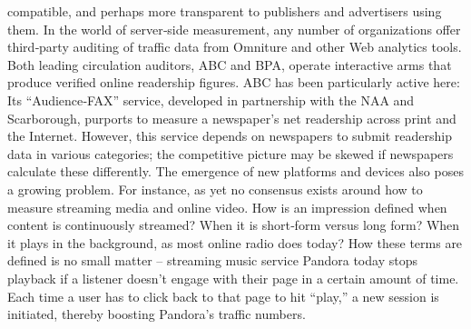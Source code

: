 compatible, and perhaps more transparent to publishers and advertisers
using them.
In the world of server‐side measurement, any number of organizations
offer third‐party auditing of traffic data from Omniture and other Web
analytics tools. Both leading circulation auditors, ABC and BPA, operate
interactive arms that produce verified online readership figures. ABC has
been particularly active here: Its ``Audience‐FAX'' service, developed in
partnership with the NAA and Scarborough, purports to measure a
newspaper’s net readership across print and the Internet. However, this
service depends on newspapers to submit readership data in various
categories; the competitive picture may be skewed if newspapers calculate
these differently.
The emergence of new platforms and devices also poses a growing
problem. For instance, as yet no consensus exists around how to measure
streaming media and online video. How is an impression defined when
content is continuously streamed? When it is short‐form versus long
form? When it plays in the background, as most online radio does today?
How these terms are defined is no small matter – streaming music service
Pandora today stops playback if a listener doesn’t engage with their page
in a certain amount of time. Each time a user has to click back to that page
to hit ``play,'' a new session is initiated, thereby boosting Pandora’s traffic
numbers.
